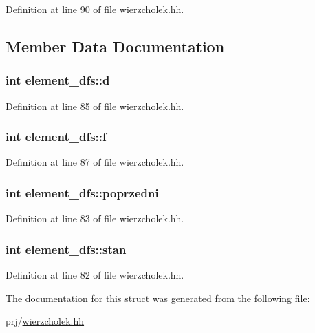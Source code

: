 \-Definition at line 90 of file wierzcholek.\-hh.



\subsection{\-Member \-Data \-Documentation}
\hypertarget{structelement__dfs_ae2d3c82805dc8b9b24a7dc1511c283dd}{
\subsubsection[{d}]{\setlength{\rightskip}{0pt plus 5cm}int {\bf element\-\_\-dfs\-::d}}}\label{structelement__dfs_ae2d3c82805dc8b9b24a7dc1511c283dd}


\-Definition at line 85 of file wierzcholek.\-hh.

\hypertarget{structelement__dfs_a9a75ad927680701485941a4e42b36290}{
\subsubsection[{f}]{\setlength{\rightskip}{0pt plus 5cm}int {\bf element\-\_\-dfs\-::f}}}\label{structelement__dfs_a9a75ad927680701485941a4e42b36290}


\-Definition at line 87 of file wierzcholek.\-hh.

\hypertarget{structelement__dfs_af3205a446fe8c834532d3b5de81deefa}{
\subsubsection[{poprzedni}]{\setlength{\rightskip}{0pt plus 5cm}int {\bf element\-\_\-dfs\-::poprzedni}}}\label{structelement__dfs_af3205a446fe8c834532d3b5de81deefa}


\-Definition at line 83 of file wierzcholek.\-hh.

\hypertarget{structelement__dfs_a48b8257c62eb0f4c52e10bf2c06fffda}{
\subsubsection[{stan}]{\setlength{\rightskip}{0pt plus 5cm}int {\bf element\-\_\-dfs\-::stan}}}\label{structelement__dfs_a48b8257c62eb0f4c52e10bf2c06fffda}


\-Definition at line 82 of file wierzcholek.\-hh.



\-The documentation for this struct was generated from the following file\-:\begin{DoxyCompactItemize}
\item 
prj/\hyperlink{wierzcholek_8hh}{wierzcholek.\-hh}\end{DoxyCompactItemize}
